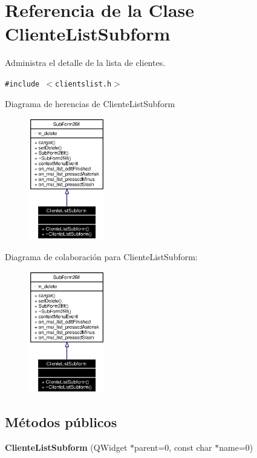 \section{Referencia de la Clase Cliente\-List\-Subform}
\label{classClienteListSubform}
Administra el detalle de la lista de clientes.  


{\tt \#include $<$clientslist.h$>$}

Diagrama de herencias de Cliente\-List\-Subform\begin{figure}[H]
\begin{center}
\leavevmode
\includegraphics[width=94pt]{classClienteListSubform__inherit__graph}
\end{center}
\end{figure}
Diagrama de colaboraci\'{o}n para Cliente\-List\-Subform:\begin{figure}[H]
\begin{center}
\leavevmode
\includegraphics[width=94pt]{classClienteListSubform__coll__graph}
\end{center}
\end{figure}
\subsection*{M\'{e}todos p\'{u}blicos}
\begin{CompactItemize}
\item 
{\bf Cliente\-List\-Subform} (QWidget $\ast$parent=0, const char $\ast$name=0)
\end{CompactItemize}


